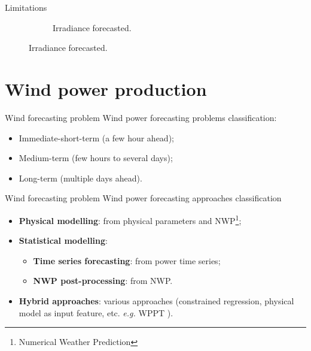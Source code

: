 \documentclass[12pt]{beamer}
\begin{document}
\begin{frame}{Limitations}
\begin{figure}
\begin{subfigure}{0.48\textwidth}
		\caption{Irradiance forecasted.}
	\end{subfigure}
\end{figure}
\end{frame}


\section{Wind power production}

\begin{frame}{Wind forecasting problem}
	Wind power forecasting \alert{problems classification}:
	\begin{itemize}
		\item Immediate-short-term (a few hour ahead);
		\item \alert<2>{Medium-term (few hours to several days)};
		\item Long-term (multiple days ahead).
	\end{itemize}
\end{frame}

\begin{frame}{Wind forecasting problem}
	Wind power forecasting \alert{approaches classification}
	\begin{itemize}
		\item \textbf{Physical modelling}: from physical parameters and NWP\footnote{Numerical Weather Prediction};
		\item \textbf{Statistical modelling}:
		\begin{itemize}
			\item \textbf{Time series forecasting}: from power time series;
			\item \alert<2>{\textbf{NWP post-processing}}: from NWP.
		\end{itemize}
		\item \textbf{Hybrid approaches}: various approaches (constrained regression, physical model as input feature, etc. \textit{e.g.} WPPT \parencite{croonenbroeck2014windpower}).
	\end{itemize}
\end{frame}
\end{document}
